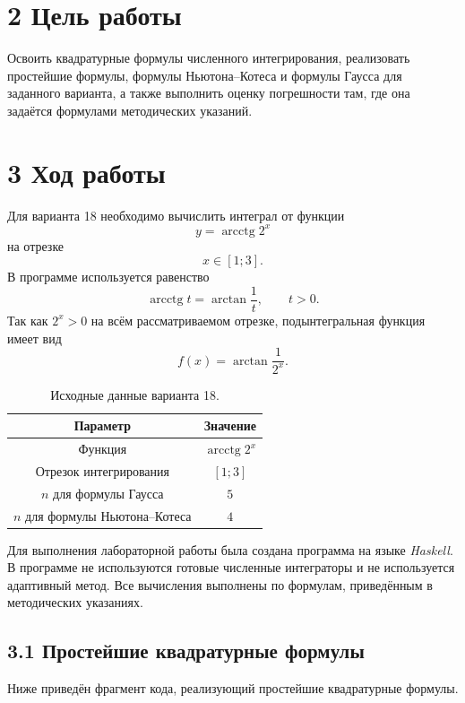 \documentclass[14pt,a4paper]{extarticle}
\begin{document}
\section*{2 Цель работы}
Освоить квадратурные формулы численного интегрирования, реализовать простейшие формулы, формулы Ньютона--Котеса и формулы Гаусса для заданного варианта, а также выполнить оценку погрешности там, где она задаётся формулами методических указаний.

\newpage

\section*{3 Ход работы}
Для варианта 18 необходимо вычислить интеграл от функции
\[
    y=\operatorname{arcctg} 2^x
\]
на отрезке
\[
    x\in[1;3].
\]
В программе используется равенство
\[
    \operatorname{arcctg} t = \arctan\frac{1}{t}, \qquad t>0.
\]
Так как $2^x>0$ на всём рассматриваемом отрезке, подынтегральная функция имеет вид
\[
    f(x)=\arctan\frac{1}{2^x}.
\]

\begin{table}[H]
\centering
\caption{Исходные данные варианта 18.}
\begin{tabular}{|c|c|}
\hline
Параметр & Значение \\ \hline
Функция & $\operatorname{arcctg}2^x$ \\ \hline
Отрезок интегрирования & $[1;3]$ \\ \hline
$n$ для формулы Гаусса & $5$ \\ \hline
$n$ для формулы Ньютона--Котеса & $4$ \\ \hline
\end{tabular}
\end{table}

Для выполнения лабораторной работы была создана программа на языке \textit{Haskell}. В программе не используются готовые численные интеграторы и не используется адаптивный метод. Все вычисления выполнены по формулам, приведённым в методических указаниях.

\subsection*{3.1 Простейшие квадратурные формулы}
Ниже приведён фрагмент кода, реализующий простейшие квадратурные формулы.
\end{document}
